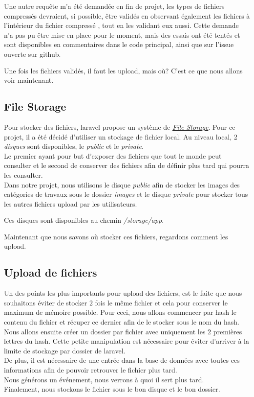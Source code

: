 \documentclass[
    iai, %
    il, %
]{heig-tb}
\begin{document}
Une autre requête m'a été demandée en fin de projet, les types de fichiers compressés devraient, si possible, être validés en observant également les fichiers à l'intérieur du fichier compressé , tout en les validant eux aussi. Cette demande n'a pas pu être mise en place pour le moment, mais des essais ont été tentés et sont disponibles en commentaires dans le code principal, ainsi que sur l'issue ouverte sur \Gls{github}.

Une fois les fichiers validés, il faut les upload, mais où? C'est ce que nous allons voir maintenant.

\subsection{File Storage}
Pour stocker des fichiers, \Gls{laravel} propose un système de \href{https://laravel.com/docs/9.x/filesystem}{\emph{File Storage}}. Pour ce projet, il a été décidé d'utiliser un stockage de fichier local. Au niveau local, 2 \emph{disques} sont disponibles, le \emph{public} et le \emph{private}. \\
Le premier ayant pour but d'exposer des fichiers que tout le monde peut consulter et le second de conserver des fichiers afin de définir plus tard qui pourra les consulter. \\

Dans notre projet, nous utilisons le disque \emph{public} afin de stocker les images des catégories de travaux sous le dossier \emph{images} et le disque \emph{private} pour stocker tous les autres fichiers upload par les utilisateurs.

Ces disques sont disponibles au chemin \emph{/storage/app}.

Maintenant que nous savons où stocker ces fichiers, regardons comment les upload.

\subsection{Upload de fichiers}
Un des points les plus importants pour upload des fichiers, est le faite que nous souhaitons éviter de stocker 2 fois le même fichier et cela pour conserver le maximum de mémoire possible. Pour ceci, nous allons commencer par \Gls{hash} le contenu du fichier et récuper ce dernier afin de le stocker sous le nom du \Gls{hash}. \\
Nous allons ensuite créer un dossier par fichier avec uniquement les 2 premières lettres du \Gls{hash}. Cette petite manipulation est nécessaire pour éviter d'arriver à la limite de stockage par dossier de \Gls{laravel}. \\
De plus, il est nécessaire de une entrée dans la base de données avec toutes ces informations afin de pouvoir retrouver le fichier plus tard. \\
Nous générons un événement, nous verrons à quoi il sert plus tard. \\
Finalement, nous stockons le fichier sous le bon disque et le bon dossier.
\end{document}
